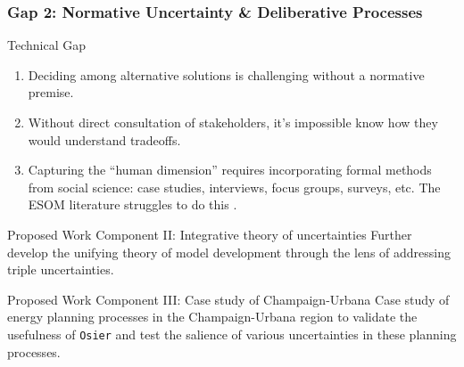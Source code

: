 

\begin{frame}
    \frametitle{Gap 2: Normative Uncertainty \& Deliberative Processes}
    \begin{block}{Technical Gap}
        \begin{enumerate}
            \item Deciding among alternative solutions is challenging without a normative premise.
            \item Without direct consultation of stakeholders, it's impossible know how they would understand tradeoffs.
            \item Capturing the ``human dimension'' requires incorporating formal methods from social science: case studies,
            interviews, focus groups, surveys, etc. The ESOM literature struggles to do this \cite{pfenninger_energy_2014}.
        \end{enumerate}
    \end{block}
    \begin{block}{Proposed Work Component II: Integrative theory of uncertainties}
        Further develop the unifying theory of model development through the lens of 
        addressing triple uncertainties.
    \end{block}
    \begin{block}{Proposed Work Component III: Case study of Champaign-Urbana}
        Case study of energy planning processes in the Champaign-Urbana region to validate
        the usefulness of \texttt{Osier} and test the salience of various uncertainties in
        these planning processes.
    \end{block}
    
\end{frame}